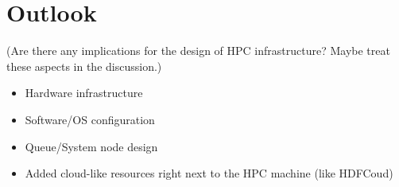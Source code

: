\section{Outlook}

(Are there any implications for the design of HPC infrastructure? Maybe treat these aspects in the discussion.)

\begin{itemize}
  \item Hardware infrastructure
  \item Software/OS configuration
  \item Queue/System node design
  \item Added cloud-like resources right next to the HPC machine (like HDFCoud)
\end{itemize}
